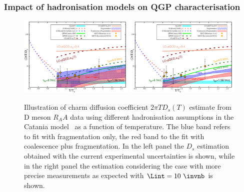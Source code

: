 


\subsubsection{Impact of hadronisation models on QGP characterisation}
\label{sec:HFhadro3}


\begin{figure}[!ht]
\begin{center}
\includegraphics[width=0.49\textwidth]{hf/figures/Ds_Tc_large.pdf}
\includegraphics[width=0.49\textwidth]{hf/figures/Ds_Tc_small.pdf}
\end{center}
\caption{Illustration of charm diffusion coefficient $2 \pi T D_s(T)$ 
estimate from D meson $R_AA$ data using different hadronisation assumptions in the Catania model~\cite{Das:2015ana,Das:2013kea} as a function of temperature. The blue band refers to fit with fragmentation only, the red band to the fit with coalescence plus fragmentation. In the left panel the $D_s$ estimation obtained with the current experimental uncertainties is shown, while in the right panel the estimation considering the case with more precise measurements as expected with $\Lint=10~\invnb$ is shown.}
\label{Fig:CHI2}
\end{figure}



